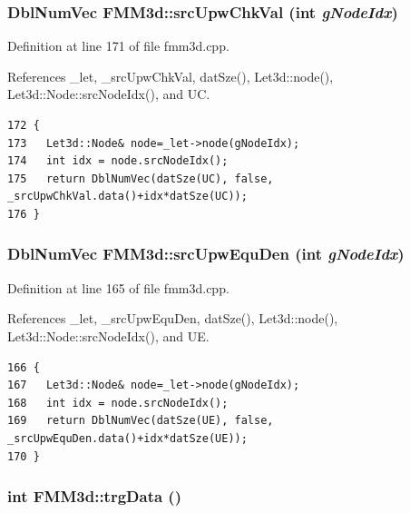 \subsubsection{\setlength{\rightskip}{0pt plus 5cm}Dbl\-Num\-Vec FMM3d::src\-Upw\-Chk\-Val (int {\em g\-Node\-Idx})\hspace{0.3cm}{\tt  [protected]}}\label{classFMM3d_1095047201cfb7c8acc39803d296018c_1095047201cfb7c8acc39803d296018c}




Definition at line 171 of file fmm3d.cpp.

References \_\-let, \_\-src\-Upw\-Chk\-Val, dat\-Sze(), Let3d::node(), Let3d::Node::src\-Node\-Idx(), and UC.

\footnotesize\begin{verbatim}172 {
173   Let3d::Node& node=_let->node(gNodeIdx);
174   int idx = node.srcNodeIdx();
175   return DblNumVec(datSze(UC), false, _srcUpwChkVal.data()+idx*datSze(UC));
176 }
\end{verbatim}\normalsize 


\subsubsection{\setlength{\rightskip}{0pt plus 5cm}Dbl\-Num\-Vec FMM3d::src\-Upw\-Equ\-Den (int {\em g\-Node\-Idx})\hspace{0.3cm}{\tt  [protected]}}\label{classFMM3d_65a76a32d03b46afab9fa3c6092d817a_65a76a32d03b46afab9fa3c6092d817a}




Definition at line 165 of file fmm3d.cpp.

References \_\-let, \_\-src\-Upw\-Equ\-Den, dat\-Sze(), Let3d::node(), Let3d::Node::src\-Node\-Idx(), and UE.

\footnotesize\begin{verbatim}166 {
167   Let3d::Node& node=_let->node(gNodeIdx);
168   int idx = node.srcNodeIdx();
169   return DblNumVec(datSze(UE), false, _srcUpwEquDen.data()+idx*datSze(UE));
170 }
\end{verbatim}\normalsize 


\subsubsection{\setlength{\rightskip}{0pt plus 5cm}int FMM3d::trg\-Data ()\hspace{0.3cm}{\tt  [protected]}}\label{classFMM3d_ca481263feff458d83769363d3ad85f7_ca481263feff458d83769363d3ad85f7}


